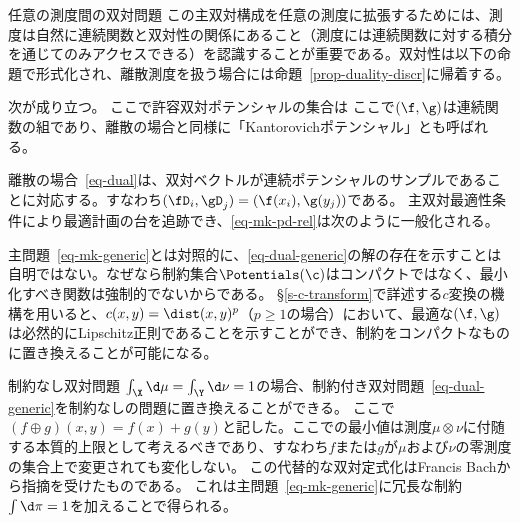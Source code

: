 \begin{rem2}{任意の測度間の双対問題}
	この主双対構成を任意の測度に拡張するためには、測度は自然に連続関数と双対性の関係にあること（測度には連続関数に対する積分を通じてのみアクセスできる）を認識することが重要である。双対性は以下の命題で形式化され、離散測度を扱う場合には命題~\ref{prop-duality-discr}に帰着する。

	\begin{prop}
	次が成り立つ。
	ここで許容双対ポテンシャルの集合は
	ここで$(\f,\g)$は連続関数の組であり、離散の場合と同様に「Kantorovichポテンシャル」とも呼ばれる。
	\end{prop}


	離散の場合~\eqref{eq-dual}は、双対ベクトルが連続ポテンシャルのサンプルであることに対応する。すなわち$(\fD_i,\gD_j)=(\f(x_i),\g(y_j))$である。
	主双対最適性条件により最適計画の台を追跡でき、\eqref{eq-mk-pd-rel}は次のように一般化される。

	主問題~\eqref{eq-mk-generic}とは対照的に、\eqref{eq-dual-generic}の解の存在を示すことは自明ではない。なぜなら制約集合$\Potentials(\c)$はコンパクトではなく、最小化すべき関数は強制的でないからである。
	\S\ref{s-c-transform}で詳述する$c$変換の機構を用いると、$c(x,y)=\dist(x,y)^p$（$p\geq 1$の場合）において、最適な$(\f,\g)$は必然的にLipschitz正則であることを示すことができ、制約をコンパクトなものに置き換えることが可能になる。
\end{rem2}

\begin{rem2}{制約なし双対問題}\label{rem-uncons-dual}
$\int_\X \d\mu=\int_\Y\d\nu = 1$の場合、制約付き双対問題~\eqref{eq-dual-generic}を制約なしの問題に置き換えることができる。
ここで$(f\oplus g)(x,y)=f(x)+g(y)$と記した。ここでの最小値は測度$\mu \otimes \nu$に付随する本質的上限として考えるべきであり、すなわち$f$または$g$が$\mu$および$\nu$の零測度の集合上で変更されても変化しない。
%
この代替的な双対定式化はFrancis Bachから指摘を受けたものである。
%
これは主問題~\eqref{eq-mk-generic}に冗長な制約$\int \d\pi=1$を加えることで得られる。
\end{rem2}


